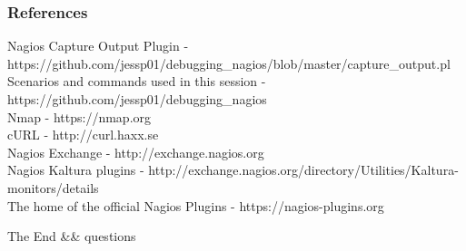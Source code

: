 \documentclass[aspectratio=169]{beamer}
\begin{document}
\begin{frame}
\frametitle{References}
\footnotesize{
\begin{thebibliography}{30} %
 Nagios Capture Output Plugin - https://github.com/jessp01/debugging\_nagios/blob/master/capture\_output.pl  \\
 Scenarios and commands used in this session - https://github.com/jessp01/debugging\_nagios \\ 
 Nmap - https://nmap.org  \\
 cURL - http://curl.haxx.se  \\
 Nagios Exchange - http://exchange.nagios.org \\
 Nagios Kaltura plugins  - http://exchange.nagios.org/directory/Utilities/Kaltura-monitors/details \\
 The home of the official Nagios Plugins - https://nagios-plugins.org \\
\end{thebibliography}
}
\end{frame}

\begin{frame}
\Huge{\centerline{The End \&\& questions}}
\end{frame}

\end{document}

